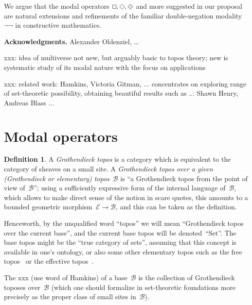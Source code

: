 \documentclass[oneside,reqno]{amsart}
\theoremstyle{definition}
\newtheorem{defn}{Definition}[section]
\theoremstyle{plain}
\theoremstyle{remark}
\newcommand{\E}{\mathcal{E}}
\newcommand{\B}{\mathcal{B}}
\newcommand{\Set}{\mathrm{Set}}
\renewcommand{\_}{\mathpunct{.}\,}
\DeclareMathOperator{\possible}{\text{\tikz[scale=.6ex/1cm,baseline=-.6ex,rotate=45,line width=.1ex]{\draw (-1,-1) rectangle (1,1);}}}
\DeclareMathOperator{\necessary}{\text{\tikz[scale=.6ex/1cm,baseline=-.6ex,line width=.1ex]{\draw (-1,-1) rectangle (1,1);}}}
\DeclareMathOperator{\xpossible}{\text{\tikz[scale=.6ex/1cm,baseline=-.6ex,rotate=45,line width=.1ex]{\draw (-1,-1) rectangle (1,1); \draw[very thin] (-.6,-.6) rectangle (.6,.6);}}}
\newcommand{\?}{\,{:}\,}
\begin{document}
We argue that the modal operators~$\necessary,\possible,\xpossible$ and more
suggested in our proposal are natural extensions and refinements of the
familiar double-negation modality~$\neg\neg$ in constructive mathematics.

\textbf{Acknowledgments.} Alexander Oldenziel, \ldots

xxx: idea of multiverse not new, but arguably basic to topos theory; new is systematic
study of its modal nature with the focus on applications

xxx: related work: Hamkins, Victoria Gitman, ... concentrates on exploring
range of set-theoretic possibility, obtaining beautiful results such as ...
Shawn Henry, Andreas Blass ...


\section{Modal operators}
\label{sect:defn-modalities}

\begin{defn}A \emph{Grothendieck topos} is a category which is equivalent to
the category of sheaves on a small site. A \emph{Grothendieck topos over a
given (Grothendieck or elementary) topos}~$\B$ is ``a Grothendieck topos from
the point of view of~$\B$''; using a sufficiently expressive form of the
internal language of~$\B$, which allows to make direct sense of the notion in
scare quotes, this amounts to a bounded geometric morphism~$\E \to
\B$, and this can be taken as the definition.
\end{defn}

Henceworth, by the unqualified word ``topos'' we will mean ``Grothendieck topos
over the current base'', and the current base topos will be denoted~``$\Set$''.
The base topos might be the ``true category of sets'', assuming that this
concept is available in one's ontology, or also some other elementary topos
such as the free topos~\cite{xxx} or the ef{}fective topos~\cite{xxx}.

The xxx (use word of Hamkins) of a base~$\B$ is the collection of Grothendieck
toposes over~$\B$ (which one should formalize in set-theoretic foundations more
precisely as the proper class of small sites in~$\B$).
\end{document}
